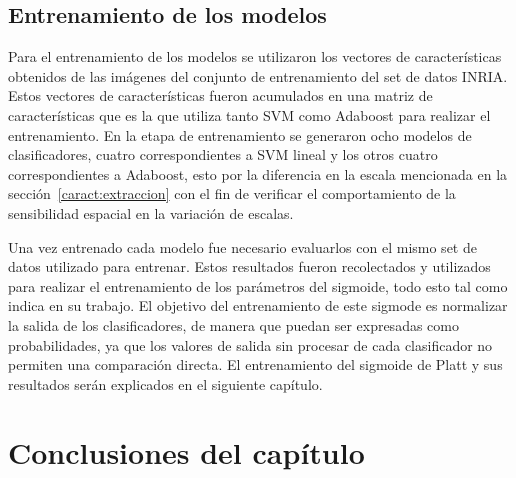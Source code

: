 \subsection{Entrenamiento de los modelos}

Para el entrenamiento de los modelos se utilizaron los vectores de características obtenidos de las imágenes del conjunto de entrenamiento del set de datos INRIA. Estos vectores de características fueron acumulados en una matriz de características que es la que utiliza tanto SVM como Adaboost para realizar el entrenamiento. En la etapa de entrenamiento se generaron ocho modelos de clasificadores, cuatro correspondientes a SVM lineal y los otros cuatro correspondientes a Adaboost, esto por la diferencia en la escala mencionada en la sección~\ref{caract:extraccion} con el fin de verificar el comportamiento de la sensibilidad espacial en la variación de escalas.

Una vez entrenado cada modelo fue necesario evaluarlos con el mismo set de datos utilizado para entrenar. Estos resultados fueron recolectados y utilizados para realizar el entrenamiento de los parámetros del sigmoide, todo esto tal como indica \cite{Platt1999} en su trabajo.  El objetivo del entrenamiento de este sigmode es normalizar la salida de los clasificadores, de manera que puedan ser expresadas como probabilidades, ya que los valores de salida sin procesar de cada clasificador no permiten una comparación directa. El entrenamiento del sigmoide de Platt y sus resultados serán explicados en el siguiente capítulo.

\section{Conclusiones del capítulo}
\label{caract:conclusiones}


